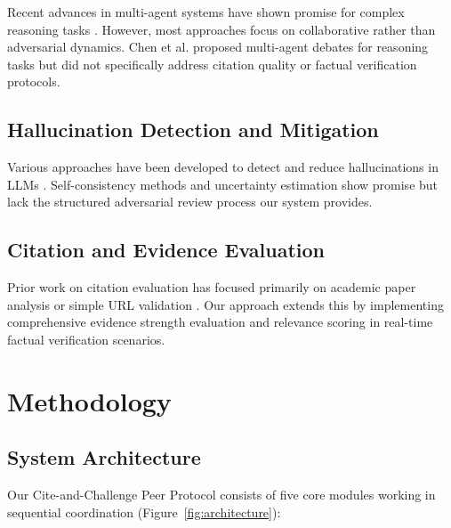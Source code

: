 \documentclass{article}
\begin{document}
Recent advances in multi-agent systems have shown promise for complex reasoning tasks \cite{park2023generative, wu2023autogen}. However, most approaches focus on collaborative rather than adversarial dynamics. Chen et al. \cite{chen2023multi} proposed multi-agent debates for reasoning tasks but did not specifically address citation quality or factual verification protocols.

\subsection{Hallucination Detection and Mitigation}

Various approaches have been developed to detect and reduce hallucinations in LLMs \cite{huang2023survey, rawte2023survey}. Self-consistency methods \cite{wang2022self} and uncertainty estimation \cite{kuhn2023semantic} show promise but lack the structured adversarial review process our system provides.

\subsection{Citation and Evidence Evaluation}

Prior work on citation evaluation has focused primarily on academic paper analysis \cite{cohan2019structural} or simple URL validation \cite{nakamura2019automatic}. Our approach extends this by implementing comprehensive evidence strength evaluation and relevance scoring in real-time factual verification scenarios.

\section{Methodology}

\subsection{System Architecture}

Our Cite-and-Challenge Peer Protocol consists of five core modules working in sequential coordination (Figure~\ref{fig:architecture}):
\end{document}
